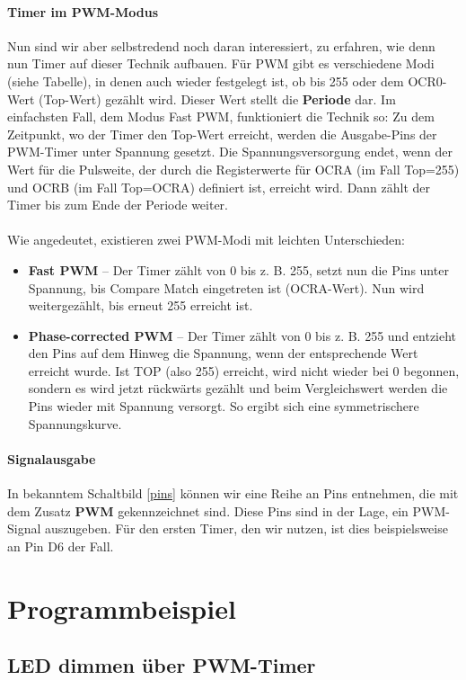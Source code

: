 \documentclass[11pt,a4paper]{scrartcl}
\begin{document}
\paragraph{Timer im PWM-Modus} Nun sind wir aber selbstredend noch daran interessiert, zu erfahren, wie denn nun Timer auf dieser Technik aufbauen. Für PWM gibt es verschiedene Modi (siehe Tabelle), in denen auch wieder festgelegt ist, ob bis 255 oder dem OCR0-Wert (Top-Wert) gezählt wird. Dieser Wert stellt die \textbf{Periode} dar. Im einfachsten Fall, dem Modus Fast PWM, funktioniert die Technik so: Zu dem Zeitpunkt, wo der Timer den Top-Wert erreicht, werden die Ausgabe-Pins der PWM-Timer unter Spannung gesetzt. Die Spannungsversorgung endet, wenn der Wert für die Pulsweite, der durch die Registerwerte für OCRA (im Fall Top=255) und OCRB (im Fall Top=OCRA) definiert ist, erreicht wird. Dann zählt der Timer bis zum Ende der Periode weiter. \\\\
Wie angedeutet, existieren zwei PWM-Modi mit leichten Unterschieden:
\begin{itemize}
\item \textbf{Fast PWM} -- Der Timer zählt von 0 bis z. B. 255, setzt nun die Pins unter Spannung, bis Compare Match eingetreten ist (OCRA-Wert). Nun wird weitergezählt, bis erneut 255 erreicht ist.
\item \textbf{Phase-corrected PWM} -- Der Timer zählt von 0 bis z. B. 255 und entzieht den Pins auf dem {\glqq}Hinweg{\grqq} die Spannung, wenn der entsprechende Wert erreicht wurde. Ist TOP (also 255) erreicht, wird nicht wieder bei 0 begonnen, sondern es wird jetzt rückwärts gezählt und beim Vergleichswert werden die Pins wieder mit Spannung versorgt. So ergibt sich eine symmetrischere Spannungskurve. 
\end{itemize}
\paragraph{Signalausgabe} In bekanntem Schaltbild \ref{pins} können wir eine Reihe an Pins entnehmen, die mit dem Zusatz \textbf{PWM} gekennzeichnet sind. Diese Pins sind in der Lage, ein PWM-Signal auszugeben. Für den ersten Timer, den wir nutzen, ist dies beispielsweise an Pin D6 der Fall.
\section{Programmbeispiel}
\subsection{LED dimmen über PWM-Timer}
\end{document}
